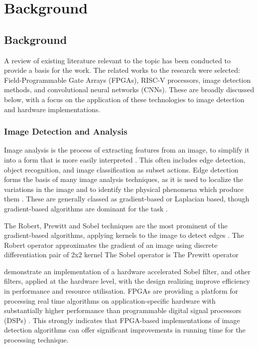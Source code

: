 \chapter[Background]{Background}

\label{Chap:Background}

\section{Background}
A review of existing literature relevant to the topic has been conducted to provide a basis for the work. 
The related works to the research were selected: Field-Programmable Gate Arrays (FPGAs), RISC-V processors, image detection methods, and convolutional neural networks (CNNs). 
These are broadly discussed below, with a focus on the application of these technologies to image detection and hardware implementations.

\subsection{Image Detection and Analysis}
Image analysis is the process of extracting features from an image, to simplify it into a form that is more easily interpreted \cite{Mathworks}.
This often includes edge detection, object recognition, and image classification as subset actions.
Edge detection forms the basis of many image analysis techniques, as it is used to localize the variations in the image and to identify the physical phenomena which produce them \cite{Gradient}.
These are generally classed as gradient-based or Laplacian based, though gradient-based algorithms are dominant for the task \cite{Gradient}.

The Robert, Prewitt and Sobel techniques are the most prominent of the gradient-based algorithms, applying kernels to the image to detect edges \cite{Segmentation}.
The Robert operator approximates the gradient of an image using discrete differentiation pair of 2x2 kernel
The Sobel operator is
The Prewitt operator
\cite{XSG}

\cite{Sobel, Video, Canny, Aerial} demonstrate an implementation of a hardware accelerated Sobel filter, and other filters, applied at the hardware level, with the design realizing improve efficiency in performance and resource utilisation. 
FPGAs are providing a platform for processing real time algorithms on application-specific hardware with substantially higher performance than programmable digital signal processors (DSPs) \cite{RTEdge}.
This strongly indicates that FPGA-based implementations of image detection algorithms can offer significant improvements in running time for the processing technique.

